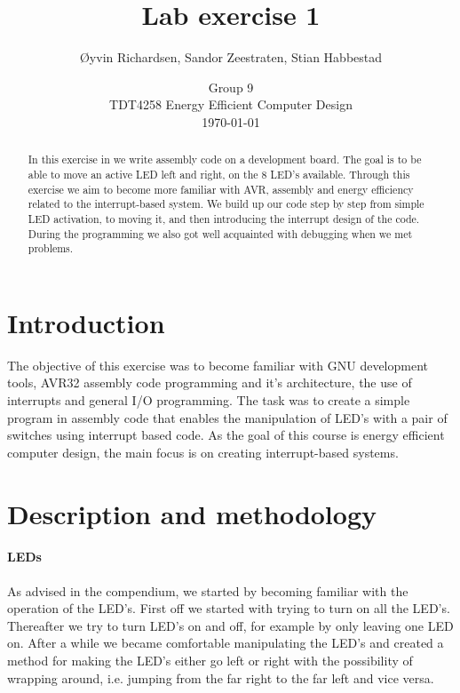 \documentclass[a4paper,11pt]{article}
\title{Lab exercise 1}
\author{\O yvin Richardsen, Sandor Zeestraten, Stian Habbestad}
\date{{Group 9}\\
TDT4258 Energy Efficient Computer Design \\
\today}
\begin{document}
\maketitle
\newpage

\begin{abstract}
In this exercise in we write assembly code on a development board. The goal is to be able to move an active LED left and right, on the 8 LED's available. Through this exercise we aim to become more familiar with AVR, assembly and energy efficiency related to the interrupt-based system. We build up our code step by step from simple LED activation, to moving it, and then introducing the interrupt design of the code. During the programming we also got well acquainted with debugging when we met problems.
\end{abstract}
\newpage

\tableofcontents
\newpage



\section{Introduction}
The objective of this exercise was to become familiar with GNU development tools, AVR32 assembly code programming and it’s architecture, the use of interrupts and general I/O programming. The task was to create a simple program in assembly code that enables the manipulation of LED’s with a pair of switches using interrupt based code. As the goal of this course is energy efficient computer design, the main focus is on creating interrupt-based systems. 

\section{Description and methodology}
\paragraph{LEDs}
As advised in the compendium, we started by becoming familiar with the operation of the LED's. First off we started with trying to turn on all the LED’s. Thereafter we try to turn LED’s on and off, for example by only leaving one LED on. After a while we became comfortable manipulating the LED's and created a method for making the LED's either go left or right with the possibility of wrapping around, i.e. jumping from the far right to the far left and vice versa.
\end{document}

